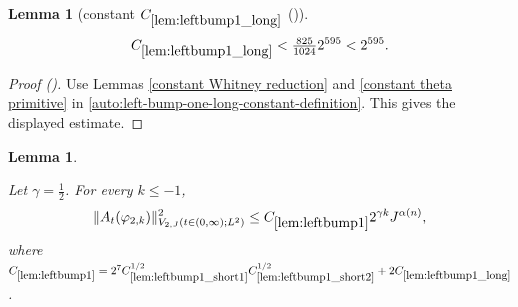 \documentclass[12pt,reqno]{amsart}
\newcommand{\auto}{{({\tiny\faCar})}}
\theoremstyle{plain}
\newtheorem{lemma}[theorem]{Lemma}
\numberwithin{equation}{section}
\theoremstyle{remark}
\newcommand{\using}[1]{}
\begin{document}
\begin{lemma}[constant $C_{\ref{lem:leftbump1_long}}$ \auto]\label{constant left bump one long}\using{constant Whitney reduction}\using{constant theta primitive}\using{lem:leftbump1_long}
\begin{equation}\label{constant left bump one long bound}
C_{\ref{lem:leftbump1_long}}<\tfrac{825}{1024}2^{595}<2^{595}.
\end{equation}
\end{lemma}
\begin{proof}[Proof \auto]
Use Lemmas \ref{constant Whitney reduction} and \ref{constant theta primitive} in \eqref{auto:left-bump-one-long-constant-definition}. This gives the displayed estimate.
\end{proof}


\begin{lemma}\label{lem:leftbump1}\using{lem:rescaling}\using{lem:shortlongjumps}\using{lem:leftbump1_long}\using{lem:leftbump1_short1}\using{lem:leftbump1_short2}\using{lem:ftccs-R}\using{lem:ftc_ATphi}

Let $\gamma=\frac12$. For every $k\le -1$,
\begin{equation}\label{leftbump1}
\|A_{t}(\varphi_{2,k})\|_{V_{2,J}(t\in(0,\infty);L^2)}^2  \le C_{\ref{lem:leftbump1}} 2^{\gamma k} J^{\alpha(n)}, \end{equation}
where  $C_{\ref{lem:leftbump1}}
=2^7C_{\ref{lem:leftbump1_short1}}^{1/2}C_{\ref{lem:leftbump1_short2}}^{1/2}
+2C_{\ref{lem:leftbump1_long}}$.
\end{lemma}
\end{document}
